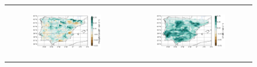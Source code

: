\begin{figure}[htbp]
    \centering
    \begin{tabular}{cc}
        \begin{subfigure}[b]{0.5\textwidth}
            \caption{}
            \includegraphics[width=\textwidth]{images/chap4/future/diffmap_precip_futirr.png}
        \end{subfigure} &
        \begin{subfigure}[b]{0.5\textwidth}
            \caption{}
            \includegraphics[width=\textwidth]{images/chap4/future/diffmap_evap_futirr.png}
        \end{subfigure} \\


\end{tabular}
\end{figure}
